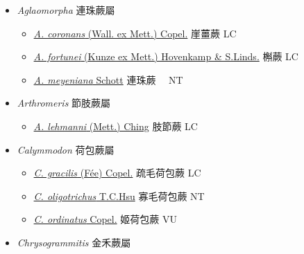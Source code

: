 
  \begin{itemize}
 \item[    ] \textit{Aglaomorpha} 連珠蕨屬
                                
  \begin{itemize}
        \item[] \href{http://www.theplantlist.org/tpl1.1/search?q=Aglaomorpha+coronans}{\textit{A. coronans} (Wall. ex Mett.) Copel.}   崖薑蕨   LC
        \item[] \href{http://www.theplantlist.org/tpl1.1/search?q=Aglaomorpha+fortunei}{\textit{A. fortunei} (Kunze ex Mett.) Hovenkamp \& S.Linds.}   槲蕨   LC
        \item[] \href{http://www.theplantlist.org/tpl1.1/search?q=Aglaomorpha+meyeniana}{\textit{A. meyeniana} Schott}   連珠蕨　   NT
  \end{itemize}
 \item[    ] \textit{Arthromeris} 節肢蕨屬
                                
  \begin{itemize}
        \item[] \href{http://www.theplantlist.org/tpl1.1/search?q=Arthromeris+lehmanni}{\textit{A. lehmanni} (Mett.) Ching}   肢節蕨   LC
  \end{itemize}
 \item[    ] \textit{Calymmodon} 荷包蕨屬
                                
  \begin{itemize}
        \item[] \href{http://www.theplantlist.org/tpl1.1/search?q=Calymmodon+gracilis}{\textit{C. gracilis} (Fée) Copel.}   疏毛荷包蕨   LC
        \item[] \href{http://www.theplantlist.org/tpl1.1/search?q=Calymmodon+oligotrichus}{\textit{C. oligotrichus} T.C.Hsu}   寡毛荷包蕨   NT
        \item[] \href{http://www.theplantlist.org/tpl1.1/search?q=Calymmodon+ordinatus}{\textit{C. ordinatus} Copel.}   姬荷包蕨   VU
  \end{itemize}
 \item[    ] \textit{Chrysogrammitis} 金禾蕨屬
                                

\end{itemize}
